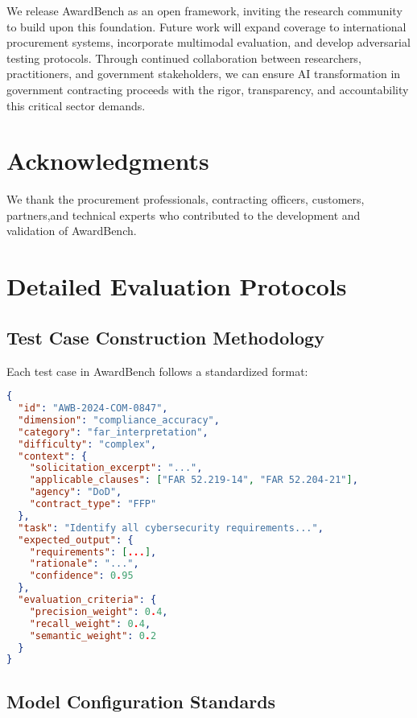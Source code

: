 \documentclass[11pt,a4paper]{article}
\begin{document}
We release AwardBench as an open framework, inviting the research community to build upon this foundation. Future work will expand coverage to international procurement systems, incorporate multimodal evaluation, and develop adversarial testing protocols. Through continued collaboration between researchers, practitioners, and government stakeholders, we can ensure AI transformation in government contracting proceeds with the rigor, transparency, and accountability this critical sector demands.

\section*{Acknowledgments}

We thank the procurement professionals, contracting officers, customers, partners,and technical experts who contributed to the development and validation of AwardBench.




\appendix

\section{Detailed Evaluation Protocols}
\label{app:protocols}

\subsection{Test Case Construction Methodology}

Each test case in AwardBench follows a standardized format:

\begin{lstlisting}[language=json, basicstyle=\small]
{
  "id": "AWB-2024-COM-0847",
  "dimension": "compliance_accuracy",
  "category": "far_interpretation",
  "difficulty": "complex",
  "context": {
    "solicitation_excerpt": "...",
    "applicable_clauses": ["FAR 52.219-14", "FAR 52.204-21"],
    "agency": "DoD",
    "contract_type": "FFP"
  },
  "task": "Identify all cybersecurity requirements...",
  "expected_output": {
    "requirements": [...],
    "rationale": "...",
    "confidence": 0.95
  },
  "evaluation_criteria": {
    "precision_weight": 0.4,
    "recall_weight": 0.4,
    "semantic_weight": 0.2
  }
}
\end{lstlisting}

\subsection{Model Configuration Standards}
\end{document}
